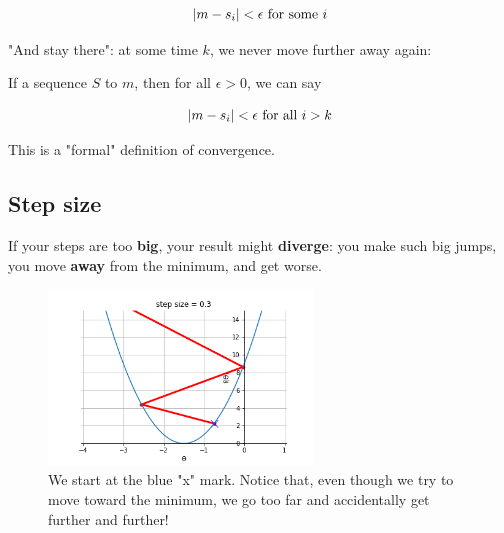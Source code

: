         \begin{equation}
            \abs{m-s_i}<\epsilon \text{ for some } i
        \end{equation}
        
        "And stay there": at some time $k$, we never move further away again:\\
        
        \begin{definition}
            If a sequence $S$  to $m$, then for all $\epsilon>0$, we can say
            
            \begin{equation}
                \abs{m-s_i}<\epsilon \text{ for all } i>k
            \end{equation}
        
        \end{definition}
        
        This is a "formal" definition of convergence.
        
    
    \subsection{Step size}
    
        If your steps are too \textbf{big}, your result might \textbf{diverge}: you make such big jumps, you move \textbf{away} from the minimum, and get worse.
        
        \begin{figure}[H]
        \centering
            \includegraphics[width=70mm,scale=0.5]{images/gradient_descent_images/diverge.png}
        
        \caption*{We start at the blue "x" mark. Notice that, even though we try to move toward the minimum, we go too far and accidentally get further and further!}
        \end{figure}
        
